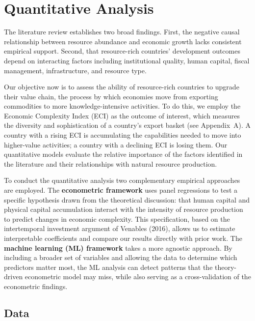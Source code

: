 \documentclass[12pt,a4paper]{report}
\begin{document}
\chapter{Quantitative Analysis}

The literature review establishes two broad findings. First, the negative causal relationship between resource abundance and economic growth lacks consistent empirical support. Second, that resource-rich countries' development outcomes depend on interacting factors including institutional quality, human capital, fiscal management, infrastructure, and resource type.

Our objective now is to assess the ability of resource-rich countries to upgrade their value chain, the process by which economies move from exporting commodities to more knowledge-intensive activities. To do this, we employ the Economic Complexity Index (ECI) as the outcome of interest, which measures the diversity and sophistication of a country's export basket (see Appendix~A). A country with a rising ECI is accumulating the capabilities needed to move into higher-value activities; a country with a declining ECI is losing them. Our quantitative models evaluate the relative importance of the factors identified in the literature and their relationships with natural resource production.

To conduct the quantitative analysis two complementary empirical approaches are employed. The \textbf{econometric framework} uses panel regressions to test a specific hypothesis drawn from the theoretical discussion: that human capital and physical capital accumulation interact with the intensity of resource production to predict changes in economic complexity. This specification, based on the intertemporal investment argument of Venables (2016), allows us to estimate interpretable coefficients and compare our results directly with prior work. The \textbf{machine learning (ML) framework} takes a more agnostic approach. By including a broader set of variables and allowing the data to determine which predictors matter most, the ML analysis can detect patterns that the theory-driven econometric model may miss, while also serving as a cross-validation of the econometric findings.


\section{Data}
\end{document}
